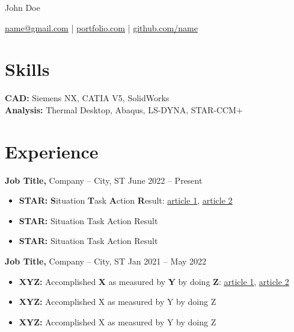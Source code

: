 \documentclass[11pt]{article}       %
\begin{document}
\centerline{\Huge John Doe}

\vspace{5pt}

\centerline{\href{mailto:name@gmail.com}{name@gmail.com} | \href{https://mitcommlab.mit.edu/meche/commkit/portfolio/}{portfolio.com} | \href{https://old.reddit.com/r/EngineeringResumes/wiki/index\#wiki_portfolios}{github.com/name}}

\vspace{-10pt}

\section*{Skills}
\textbf{CAD:} Siemens NX, CATIA V5, SolidWorks \\
\textbf{Analysis:} Thermal Desktop, Abaqus, LS-DYNA, STAR-CCM+

\vspace{-6.5pt}

\section*{Experience}
\textbf{Job Title,} {Company} -- City, ST \hfill June 2022 -- Present \\
\vspace{-9pt}
\begin{itemize}
  \item \textbf{STAR:} \textbf{S}ituation \textbf{T}ask \textbf{A}ction \textbf{R}esult: \href{https://www.levels.fyi/blog/applying-star-method-resumes.html}{\underline{article 1}}, \href{https://resumegenius.com/blog/resume-help/star-method-resume}{\underline{article 2}}
  \item \textbf{STAR:} Situation Task Action Result
  \item \textbf{STAR:} Situation Task Action Result
\end{itemize}

\textbf{Job Title,} {Company} -- City, ST \hfill Jan 2021 -- May 2022 \\
\vspace{-9pt}
\begin{itemize}
  \item \textbf{XYZ:} Accomplished \textbf{X} as measured by \textbf{Y} by doing \textbf{Z}: \href{https://www.inc.com/bill-murphy-jr/google-recruiters-say-these-5-resume-tips-including-x-y-z-formula-will-improve-your-odds-of-getting-hired-at-google.html}{\underline{article 1}}, \href{https://elevenrecruiting.com/create-an-effective-resume-xyz-resume-format/}{\underline{article 2}}
  \item \textbf{XYZ:} Accomplished X as measured by Y by doing Z
  \item \textbf{XYZ:} Accomplished X as measured by Y by doing Z
\end{itemize}
\end{document}
